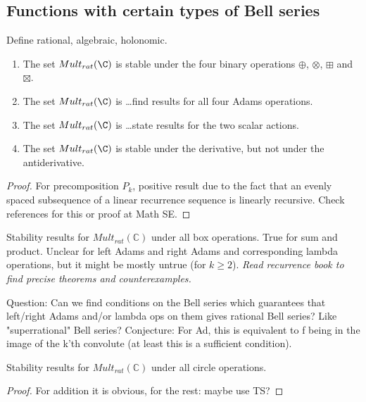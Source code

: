 \subsection{Functions with certain types of Bell series}

Define rational, algebraic, holonomic.

\begin{theorem}
\begin{enumerate}
\item The set $Mult_{rat}(\C)$ is stable under the four binary operations $\oplus$, $\otimes$, $\boxplus$ and $\boxtimes$.
\item The set $Mult_{rat}(\C)$ is \ldots find results for all four Adams operations.
\item The set $Mult_{rat}(\C)$ is \ldots state results for the two scalar actions.
\item The set $Mult_{rat}(\C)$ is stable under the derivative, but not under the antiderivative.
\end{enumerate}
\end{theorem}
\begin{proof}
For precomposition $P_k$, positive result due to the fact that an evenly spaced subsequence of a linear recurrence sequence is linearly recursive. Check references for this or proof at Math SE.
\end{proof}

\begin{theorem}
Stability results for $Mult_{rat}(\mathbb{C})$ under all box operations. True for sum and product. Unclear for left Adams and right Adams and corresponding lambda operations, but it might be mostly untrue (for $k \geq 2$). \emph{Read recurrence book to find precise theorems and counterexamples.}
\end{theorem}

Question: Can we find conditions on the Bell series which guarantees that left/right Adams and/or lambda ops on them gives rational Bell series? Like "superrational" Bell series? Conjecture: For Ad, this is equivalent to f being in the image of the k'th convolute (at least this is a sufficient condition). 




\begin{theorem}
Stability results for $Mult_{rat}(\mathbb{C})$ under all circle operations.
\end{theorem}
\begin{proof}
For addition it is obvious, for the rest: maybe use TS?
\end{proof}




